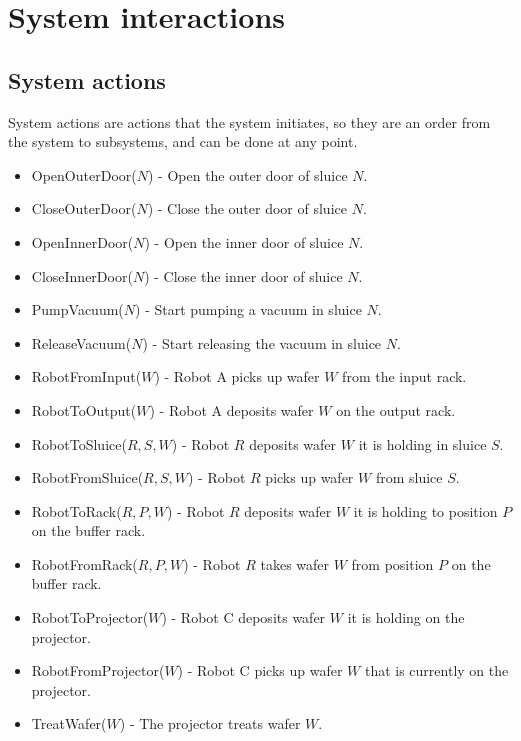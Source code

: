 \documentclass[12pt]{report}
\begin{document}
	\chapter{System interactions}
\section{System actions}
System actions are actions that the system initiates, so they are an order from the system to subsystems, and can be done at any point.
	\begin{itemize}
\item OpenOuterDoor($N$) - Open the outer door of sluice $N$.
\item CloseOuterDoor($N$) - Close the outer door of sluice $N$.
\item OpenInnerDoor($N$) - Open the inner door of sluice $N$.
\item CloseInnerDoor($N$) - Close the inner door of sluice $N$.
\item PumpVacuum($N$) - Start pumping a vacuum in sluice $N$.
\item ReleaseVacuum($N$) - Start releasing the vacuum in sluice $N$.

\item RobotFromInput($W$) - Robot A picks up wafer $W$ from the input rack.
\item RobotToOutput($W$) - Robot A deposits wafer $W$ on the output rack.

\item RobotToSluice($R, S, W$) - Robot $R$ deposits wafer $W$ it is holding in sluice $S$.
\item RobotFromSluice($R, S, W$) - Robot $R$ picks up wafer $W$ from sluice $S$.

\item RobotToRack($R, P, W$) - Robot $R$ deposits wafer $W$ it is holding to position $P$ on the buffer rack.
\item RobotFromRack($R, P, W$) - Robot $R$ takes wafer $W$ from position $P$ on the buffer rack.

\item RobotToProjector($W$) - Robot C deposits wafer $W$ it is holding on the projector.
\item RobotFromProjector($W$) - Robot C picks up wafer $W$ that is currently on the projector.

\item TreatWafer($W$) - The projector treats wafer $W$.
\end{itemize}
\end{document}
